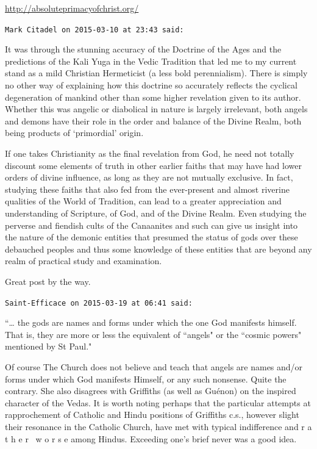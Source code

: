 \begin{footnotesize}
\begin{sffamily}
\url{http://absoluteprimacyofchrist.org/}


\hfill

\texttt{Mark Citadel on 2015-03-10 at 23:43 said: }

It was through the stunning accuracy of the Doctrine of the Ages and the predictions of the Kali Yuga in the Vedic Tradition that led me to my current stand as a mild Christian Hermeticist (a less bold perennialism). There is simply no other way of explaining how this doctrine so accurately reflects the cyclical degeneration of mankind other than some higher revelation given to its author. Whether this was angelic or diabolical in nature is largely irrelevant, both angels and demons have their role in the order and balance of the Divine Realm, both being products of `primordial' origin. 

If one takes Christianity as the final revelation from God, he need not totally discount some elements of truth in other earlier faiths that may have had lower orders of divine influence, as long as they are not mutually exclusive. In fact, studying these faiths that also fed from the ever-present and almost riverine qualities of the World of Tradition, can lead to a greater appreciation and understanding of Scripture, of God, and of the Divine Realm. Even studying the perverse and fiendish cults of the Canaanites and such can give us insight into the nature of the demonic entities that presumed the status of gods over these debauched peoples and thus some knowledge of these entities that are beyond any realm of practical study and examination.

Great post by the way.


\hfill

\texttt{Saint-Efficace on 2015-03-19 at 06:41 said: }

``… the gods are names and forms under which the one God manifests himself. That is, they are more or less the equivalent of ``angels" or the ``cosmic powers" mentioned by St Paul."

Of course The Church does not believe and teach that angels are names and/or forms under which God manifests Himself, or any such nonsense. Quite the contrary. She also disagrees with Griffiths (as well as Guénon) on the inspired character of the Vedas. It is worth noting perhaps that the particular attempts at rapprochement of Catholic and Hindu positions of Griffiths c.s., however slight their resonance in the Catholic Church, have met with typical indifference and r a t h e r \ w o r s e among Hindus. Exceeding one's brief never was a good idea.


\end{sffamily}
\end{footnotesize}
